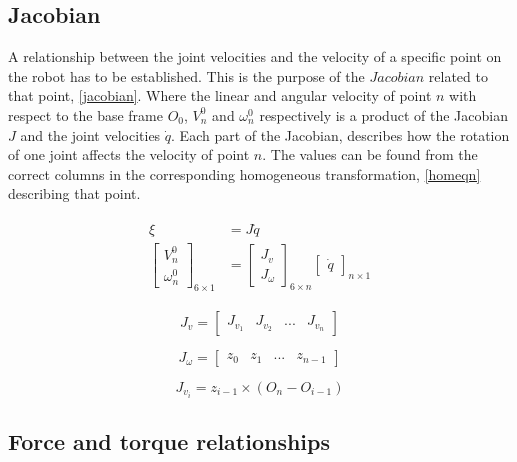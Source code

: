 \subsection{Jacobian}

A relationship between the joint velocities and the velocity of a specific point on the robot has to be established. This is the purpose of the $Jacobian$ related to that point, \eqref{jacobian}. Where the linear and angular velocity of point $n$ with respect to the base frame $O_0$, $V^0_n$ and $\omega^0_n$ respectively is a product of the Jacobian $J$ and the joint velocities $\dot{q}$. Each part of the Jacobian,  describes how the rotation of one joint affects the velocity of point $n$. The values can be found from the correct columns in the corresponding homogeneous transformation, \eqref{homeqn} describing that point.

\begin{align}\label{jacobian}
\begin{split}
\xi &= J\dot{q}\\
\begin{bmatrix}
V^0_n\\ 
\omega^0_n
\end{bmatrix}_{6\times 1}
&=
\begin{bmatrix}
J_v\\ 
J_\omega
\end{bmatrix}_{6\times n} \begin{bmatrix}
\dot{q}
\end{bmatrix}_{n\times 1}
\end{split}
\end{align}

\begin{equation}\label{Jvel}
J_v = \begin{bmatrix}
J_{v_1} & J_{v_2} & ... & J_{v_n}
\end{bmatrix}
\end{equation}

\begin{equation}\label{Jomega}
J_{\omega} = \begin{bmatrix}
z_0 & z_1 & ... & z_{n-1}
\end{bmatrix}
\end{equation}

\begin{equation}\label{Jvi}
J_{v_i} = z_{i-1}\times (O_n - O_{i-1})
\end{equation}

\subsection{Force and torque relationships}
